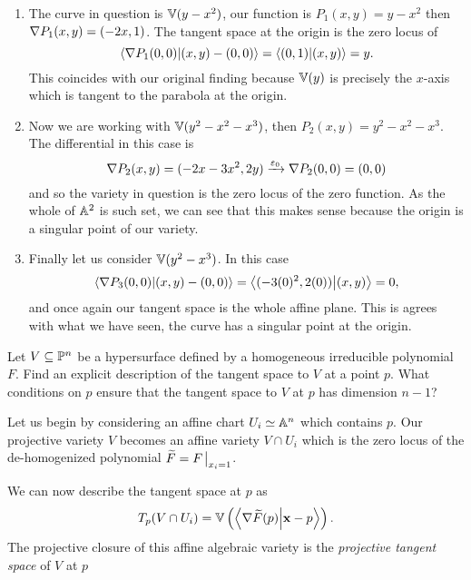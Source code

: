 \documentclass[12pt]{memoir}
\begin{document}
\begin{ptcbr}
\begin{enumerate}
	\item The curve in question is $\mathbb{V}(y-x^2)$, our function is $P_1(x,y)=y-x^2$ then $\nabla P_1(x,y)=(-2x,1)$. The tangent space at the origin is the zero locus of 
	$$\braket{\nabla P_1(0,0)}{(x,y)-(0,0)}=\braket{(0,1)}{(x,y)}=y.$$
	This coincides with our original finding because $\mathbb{V}(y)$ is precisely the $x$-axis which is tangent to the parabola at the origin.
	\item Now we are working with $\mathbb{V}(y^2-x^2-x^3)$, then $P_2(x,y)=y^2-x^2-x^3$. The differential in this case is 
	$$\nabla P_2(x,y)=(-2x-3x^2,2y)\xrightarrow{\varepsilon_0}\nabla P_2(0,0)=(0,0)$$
	and so the variety in question is the zero locus of the zero function. As the whole of $\mathbb{A}^2$ is such set, we can see that this makes sense because the origin is a singular point of our variety. 
	\item Finally let us consider $\mathbb{V}(y^2-x^3)$. In this case 
	$$\braket{\nabla P_3(0,0)}{(x,y)-(0,0)}=\braket{(-3(0)^2,2(0))}{(x,y)}=0,$$
	and once again our tangent space is the whole affine plane. This is agrees with what we have seen, the curve has a singular point at the origin.
\end{enumerate}
\end{ptcbr}
\begin{Ej}
	Let $V\subseteq\mathbb{P}^n$ be a hypersurface defined by a homogeneous
	irreducible polynomial $F$. Find an explicit description of the tangent space
	to $V$ at a point $p$. What conditions on $p$ ensure that the tangent space to
	$V$ at $p$ has dimension $n - 1$?
\end{Ej}

\begin{ptcbr}
Let us begin by considering an affine chart $U_i\simeq\mathbb{A}^n$ which contains $p$. Our projective variety $V$ becomes an affine variety $V\cap U_i$ which is the zero locus of the de-homogenized polynomial $\widetilde{F}=F\eval_{x_i=1}$.\par 
We can now describe the tangent space at $p$ as 
$$T_p(V\cap U_i)=\mathbb{V}\left(\braket{\nabla\widetilde{F}(p)}{\mathbf{x}-p}\right).$$
The projective closure of this affine algebraic variety is the \emph{projective tangent space} of $V$ at $p$
\end{ptcbr}
\end{document}
